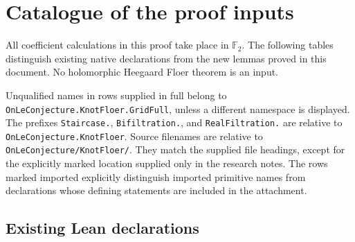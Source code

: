\documentclass[11pt,oneside]{report}
\theoremstyle{definition}
\numberwithin{equation}{section}
\newcommand{\decl}[1]{\textnormal{\nolinkurl{#1}}}
\begin{document}
\section{Catalogue of the proof inputs}
\label{J21:sec:j21-lemma-catalogue}

All coefficient calculations in this proof take place in
$\mathbb F _2$. The following tables distinguish existing native
declarations from the new lemmas proved in this document.
No holomorphic Heegaard Floer theorem is an input.

Unqualified names in rows supplied in full belong to
\decl{OnLeConjecture.KnotFloer.GridFull}, unless a different namespace
is displayed. The prefixes \decl{Staircase.}, \decl{Bifiltration.},
and \decl{RealFiltration.} are relative to
\decl{OnLeConjecture.KnotFloer}.
Source filenames are relative to \decl{OnLeConjecture/KnotFloer/}.
They match the supplied file headings, except for the explicitly marked
location supplied only in the research notes.
The rows marked imported explicitly distinguish imported
primitive names from declarations whose defining statements are
included in the attachment.

\providecommand{\jtwentyonefile}[2]{\texttt{#1}\allowbreak\texttt{#2}}

\subsection{Existing Lean declarations}
\end{document}
